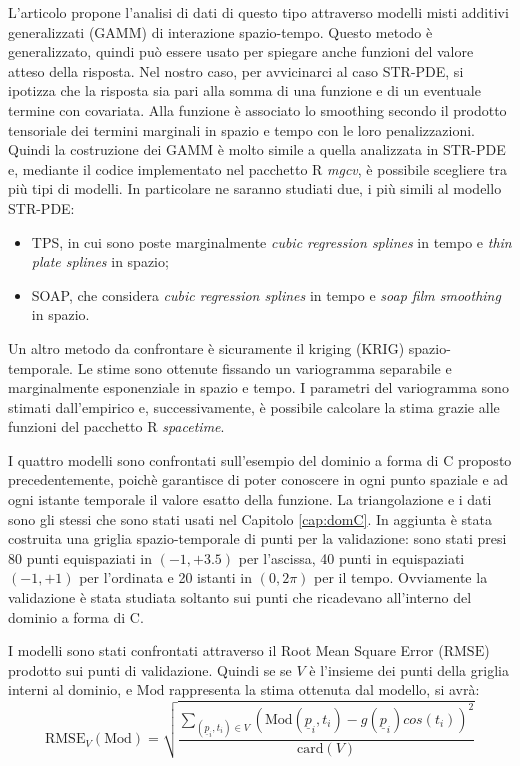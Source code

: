 \documentclass[a4paper,11pt,twoside,openright]{book}							%
\begin{document}
L'articolo \cite{art:augustin} propone l'analisi di dati di questo tipo attraverso modelli misti additivi generalizzati (GAMM) di interazione spazio-tempo. Questo metodo è generalizzato, quindi può essere usato per spiegare anche funzioni del valore atteso della risposta. Nel nostro caso, per avvicinarci al caso STR-PDE, si ipotizza che la risposta sia pari alla somma di una funzione e di un eventuale termine con covariata. Alla funzione è associato lo smoothing secondo il prodotto tensoriale dei termini marginali in spazio e tempo con le loro penalizzazioni. Quindi la costruzione dei GAMM è molto simile a quella analizzata in STR-PDE e, mediante il codice implementato nel pacchetto R \textit{mgcv}, è possibile scegliere tra più tipi di modelli. In particolare ne saranno studiati due, i più simili al modello STR-PDE:
\begin{itemize}
\item TPS, in cui sono poste marginalmente \textit{cubic regression splines} in tempo e \textit{thin plate splines} in spazio;
\item SOAP, che considera \textit{cubic regression splines} in tempo e \textit{soap film smoothing} in spazio.
\end{itemize}

Un altro metodo da confrontare è sicuramente il kriging (KRIG) spazio-temporale. Le stime sono ottenute fissando un variogramma separabile e marginalmente esponenziale in spazio e tempo. I parametri del variogramma sono stimati dall'empirico e, successivamente, è possibile calcolare la stima grazie alle funzioni del pacchetto R \textit{spacetime}. 

I quattro modelli sono confrontati sull'esempio del dominio a forma di C proposto precedentemente, poichè garantisce di poter conoscere in ogni punto spaziale e ad ogni istante temporale il valore esatto della funzione. La triangolazione e i dati sono gli stessi che sono stati usati nel Capitolo \ref{cap:domC}. In aggiunta è stata costruita una griglia spazio-temporale di punti per la validazione: sono stati presi 80 punti equispaziati in $(-1,+3.5)$ per l'ascissa, 40 punti in equispaziati $(-1,+1)$ per l'ordinata e 20 istanti in $(0,2\pi)$ per il tempo. Ovviamente la validazione è stata studiata soltanto sui punti che ricadevano all'interno del dominio a forma di C.

I modelli sono stati confrontati attraverso il Root Mean Square Error ($\mathrm{RMSE}$) prodotto sui punti di validazione. Quindi se se $V$ è l'insieme dei punti della griglia interni al dominio, e $\mathrm{Mod}$ rappresenta la stima ottenuta dal modello, si avrà:
$$
\mathrm{RMSE}_V(\mathrm{Mod})=\sqrt{\frac{\sum_{(\underline p_i,t_i)\in V} (\mathrm{Mod}(\underline p_i,t_i)-g(\underline p_i)cos(t_i))^2}{\mathrm{card}(V)}}
$$ 
\end{document}
